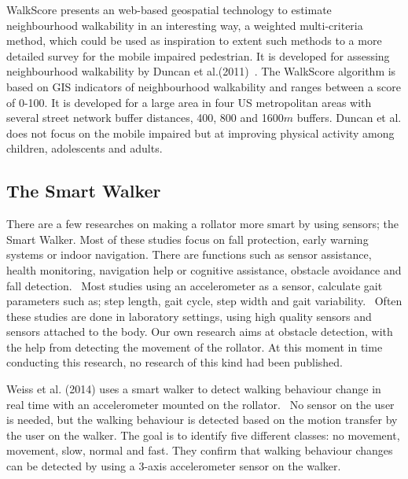 WalkScore presents an web-based geospatial technology to estimate neighbourhood walkability in an interesting way, a weighted multi-criteria method, which could be used as inspiration to extent such methods to a more detailed survey for the mobile impaired pedestrian. It is developed for assessing neighbourhood walkability by Duncan et al.(2011)~\cite{Duncan2011}. The WalkScore algorithm is based on GIS indicators of neighbourhood walkability and ranges between a score of 0-100. It is developed for a large area in four US metropolitan areas with several street network buffer distances, 400, 800 and 1600$m$ buffers. Duncan et al. does not focus on the mobile impaired but at improving physical activity among children, adolescents and adults. 

\subsection{The Smart Walker}
There are a few researches on making a rollator more smart by using sensors; the Smart Walker. Most of these studies focus on fall protection, early warning systems or indoor navigation. There are functions such as sensor assistance, health monitoring, navigation help or cognitive assistance, obstacle avoidance and fall detection.~\cite{Wang2015} Most studies using an accelerometer as a sensor, calculate gait parameters such as; step length, gait cycle, step width and gait variability.~\cite{Wang2015} Often these studies are done in laboratory settings, using high quality sensors and sensors attached to the body. Our own research aims at obstacle detection, with the help from detecting the movement of the rollator. At this moment in time conducting this research, no research of this kind had been published.

Weiss et al. (2014) uses a smart walker to detect walking behaviour change in real time with an accelerometer mounted on the rollator.~\cite{Weiss2014} No sensor on the user is needed, but the walking behaviour is detected based on the motion transfer by the user on the walker. The goal is to identify five different classes: no movement, movement, slow, normal and fast. They confirm that walking behaviour changes can be detected by using a 3-axis accelerometer sensor on the walker.~\cite{Weiss2014}

